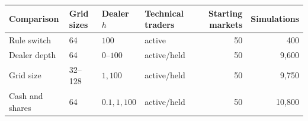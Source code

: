 \setcounter{table}{0}
\renewcommand{\thetable}{S\arabic{table}}

\begin{center}
\begin{minipage}{\linewidth}\centering
\captionsetup{type=table,hypcap=false}
\caption{Design of the four main comparisons. Active technical traders responded to the quoted price; held technical traders stayed in Hold. The grid-size comparison used active technical traders at dealer depth $h=1$ and $100$, and held technical traders at $h=100$. Counts include the no-switch controls. Where a comparison tested several fractions, one control per starting market and condition served all of them. The cash-and-shares comparison had no no-switch controls.}
\label{tab:campaigns}
\small\setlength{\tabcolsep}{4pt}
\begin{tabular}{llllrr}
\toprule
Comparison & Grid sizes & Dealer $h$ & Technical traders & Starting markets & Simulations \\
\midrule
Rule switch & 64 & $100$ & active & 50 & 400 \\
Dealer depth & 64 & $0$--$100$ & active/held & 50 & 9,600 \\
Grid size & 32--128 & $1,100$ & active/held & 50 & 9,750 \\
Cash and shares & 64 & $0.1,1,100$ & active/held & 50 & 10,800 \\
\bottomrule
\end{tabular}
\end{minipage}
\end{center}
